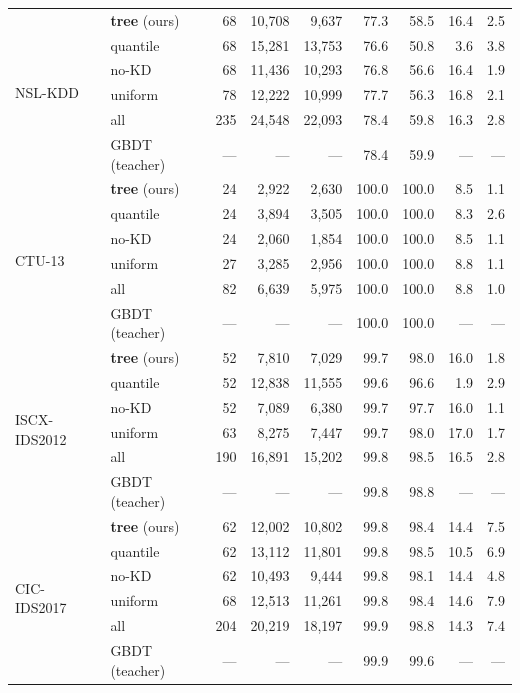 \begin{table}[!ht]
{\begin{tabular}{l l r r r r r r r}
\midrule
\multirow{6}{*}{NSL-KDD}
& \textbf{tree} (ours) & 68 & 10,708 & 9,637 & 77.3 & 58.5 & 16.4 & 2.5 \\
& quantile & 68 & 15,281 & 13,753 & 76.6 & 50.8 & 3.6 & 3.8 \\
& no-KD & 68 & 11,436 & 10,293 & 76.8 & 56.6 & 16.4 & 1.9 \\
& uniform & 78 & 12,222 & 10,999 & 77.7 & 56.3 & 16.8 & 2.1 \\
& all & 235 & 24,548 & 22,093 & 78.4 & 59.8 & 16.3 & 2.8 \\
& GBDT (teacher) & --- & --- & --- & 78.4 & 59.9 & --- & --- \\
\midrule
\multirow{6}{*}{CTU-13}
& \textbf{tree} (ours) & 24 & 2,922 & 2,630 & 100.0 & 100.0 & 8.5 & 1.1 \\
& quantile & 24 & 3,894 & 3,505 & 100.0 & 100.0 & 8.3 & 2.6 \\
& no-KD & 24 & 2,060 & 1,854 & 100.0 & 100.0 & 8.5 & 1.1 \\
& uniform & 27 & 3,285 & 2,956 & 100.0 & 100.0 & 8.8 & 1.1 \\
& all & 82 & 6,639 & 5,975 & 100.0 & 100.0 & 8.8 & 1.0 \\
& GBDT (teacher) & --- & --- & --- & 100.0 & 100.0 & --- & --- \\
\midrule
\multirow{6}{*}{ISCX-IDS2012}
& \textbf{tree} (ours) & 52 & 7,810 & 7,029 & 99.7 & 98.0 & 16.0 & 1.8 \\
& quantile & 52 & 12,838 & 11,555 & 99.6 & 96.6 & 1.9 & 2.9 \\
& no-KD & 52 & 7,089 & 6,380 & 99.7 & 97.7 & 16.0 & 1.1 \\
& uniform & 63 & 8,275 & 7,447 & 99.7 & 98.0 & 17.0 & 1.7 \\
& all & 190 & 16,891 & 15,202 & 99.8 & 98.5 & 16.5 & 2.8 \\
& GBDT (teacher) & --- & --- & --- & 99.8 & 98.8 & --- & --- \\
\midrule
\multirow{6}{*}{CIC-IDS2017}
& \textbf{tree} (ours) & 62 & 12,002 & 10,802 & 99.8 & 98.4 & 14.4 & 7.5 \\
& quantile & 62 & 13,112 & 11,801 & 99.8 & 98.5 & 10.5 & 6.9 \\
& no-KD & 62 & 10,493 & 9,444 & 99.8 & 98.1 & 14.4 & 4.8 \\
& uniform & 68 & 12,513 & 11,261 & 99.8 & 98.4 & 14.6 & 7.9 \\
& all & 204 & 20,219 & 18,197 & 99.9 & 98.8 & 14.3 & 7.4 \\
& GBDT (teacher) & --- & --- & --- & 99.9 & 99.6 & --- & --- \\

\end{tabular}}
\end{table}
